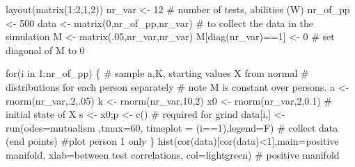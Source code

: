 \documentclass[
  a4paper,
  DIV=11,
  numbers=noendperiod,
  oneside]{scrreprt}
\newenvironment{Shaded}{}{}
\newcommand{\AttributeTok}[1]{\textcolor[rgb]{0.84,0.23,0.29}{#1}}
\newcommand{\CommentTok}[1]{\textcolor[rgb]{0.42,0.45,0.49}{#1}}
\newcommand{\ControlFlowTok}[1]{\textcolor[rgb]{0.84,0.23,0.29}{#1}}
\newcommand{\DecValTok}[1]{\textcolor[rgb]{0.00,0.36,0.77}{#1}}
\newcommand{\FloatTok}[1]{\textcolor[rgb]{0.00,0.36,0.77}{#1}}
\newcommand{\FunctionTok}[1]{\textcolor[rgb]{0.44,0.26,0.76}{#1}}
\newcommand{\NormalTok}[1]{\textcolor[rgb]{0.14,0.16,0.18}{#1}}
\newcommand{\OtherTok}[1]{\textcolor[rgb]{0.44,0.26,0.76}{#1}}
\newcommand{\SpecialCharTok}[1]{\textcolor[rgb]{0.00,0.36,0.77}{#1}}
\newcommand{\StringTok}[1]{\textcolor[rgb]{0.01,0.18,0.38}{#1}}
\begin{document}
\begin{Shaded}
\begin{Highlighting}[]
\FunctionTok{layout}\NormalTok{(}\FunctionTok{matrix}\NormalTok{(}\DecValTok{1}\SpecialCharTok{:}\DecValTok{2}\NormalTok{,}\DecValTok{1}\NormalTok{,}\DecValTok{2}\NormalTok{))}
\NormalTok{nr\_var }\OtherTok{\textless{}{-}} \DecValTok{12} \CommentTok{\# number of tests, abilities (W)}
\NormalTok{nr\_of\_pp }\OtherTok{\textless{}{-}} \DecValTok{500}
\NormalTok{data }\OtherTok{\textless{}{-}} \FunctionTok{matrix}\NormalTok{(}\DecValTok{0}\NormalTok{,nr\_of\_pp,nr\_var) }\CommentTok{\# to collect the data in the simulation}
\NormalTok{M }\OtherTok{\textless{}{-}} \FunctionTok{matrix}\NormalTok{(.}\DecValTok{05}\NormalTok{,nr\_var,nr\_var)}
\NormalTok{M[}\FunctionTok{diag}\NormalTok{(nr\_var)}\SpecialCharTok{==}\DecValTok{1}\NormalTok{] }\OtherTok{\textless{}{-}} \DecValTok{0} \CommentTok{\# set diagonal of M to 0}

\ControlFlowTok{for}\NormalTok{(i }\ControlFlowTok{in} \DecValTok{1}\SpecialCharTok{:}\NormalTok{nr\_of\_pp)}
\NormalTok{\{}
  \CommentTok{\# sample a,K, starting values X from normal }
  \CommentTok{\# distributions for each person separately}
  \CommentTok{\# note M is constant over persons.}
\NormalTok{  a }\OtherTok{\textless{}{-}} \FunctionTok{rnorm}\NormalTok{(nr\_var,.}\DecValTok{2}\NormalTok{,.}\DecValTok{05}\NormalTok{) }
\NormalTok{  k }\OtherTok{\textless{}{-}} \FunctionTok{rnorm}\NormalTok{(nr\_var,}\DecValTok{10}\NormalTok{,}\DecValTok{2}\NormalTok{)}
\NormalTok{  x0 }\OtherTok{\textless{}{-}} \FunctionTok{rnorm}\NormalTok{(nr\_var,}\DecValTok{2}\NormalTok{,}\FloatTok{0.1}\NormalTok{) }\CommentTok{\# initial state of X}
\NormalTok{  s  }\OtherTok{\textless{}{-}}\NormalTok{ x0;p }\OtherTok{\textless{}{-}} \FunctionTok{c}\NormalTok{() }\CommentTok{\# required for grind}
\NormalTok{  data[i,] }\OtherTok{\textless{}{-}} \FunctionTok{run}\NormalTok{(}\AttributeTok{odes=}\NormalTok{mutualism ,}\AttributeTok{tmax=}\DecValTok{60}\NormalTok{, }
      \AttributeTok{timeplot =}\NormalTok{ (i}\SpecialCharTok{==}\DecValTok{1}\NormalTok{),}\AttributeTok{legend=}\NormalTok{F) }\CommentTok{\# collect data (end points)}
  \CommentTok{\#plot person 1 only}
\NormalTok{\}}
\FunctionTok{hist}\NormalTok{(}\FunctionTok{cor}\NormalTok{(data)[}\FunctionTok{cor}\NormalTok{(data)}\SpecialCharTok{\textless{}}\DecValTok{1}\NormalTok{],}\AttributeTok{main=}\StringTok{\textquotesingle{}positive manifold\textquotesingle{}}\NormalTok{,}
     \AttributeTok{xlab=}\StringTok{\textquotesingle{}between test correlations\textquotesingle{}}\NormalTok{,}
     \AttributeTok{col=}\StringTok{\textquotesingle{}lightgreen\textquotesingle{}}\NormalTok{) }\CommentTok{\# positive manifold}
\end{Highlighting}
\end{Shaded}
\end{document}
